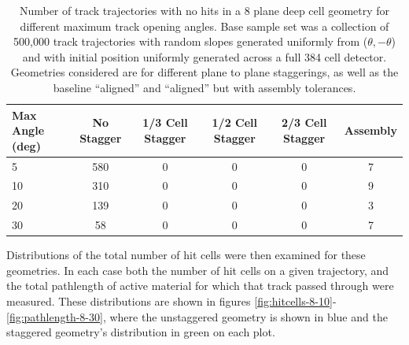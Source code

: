 \begin{table}[tb]
\begin{center}
\begin{tabular}{|l|c|c|c|c|c|}
\hline
Max Angle (deg)                 & No Stagger     & 1/3 Cell Stagger & 1/2 Cell Stagger & 2/3 Cell Stagger & Assembly\\
\hline
5                               &  580           & 0                & 0                & 0                & 7  \\
10                              &  310           & 0                & 0                & 0                & 9  \\
20                              &  139           & 0                & 0                & 0                & 3  \\
30                              &  58            & 0                & 0                & 0                & 7  \\
\hline
\end{tabular}
\caption[8 Cell Missed Hits]{Number of track trajectories with no hits in a 8 plane deep cell geometry for different maximum track opening angles.  Base sample set was a collection of 500,000 track trajectories with random slopes generated uniformly from ($\theta,-\theta$) and with initial position uniformly generated across a full 384 cell detector.  Geometries considered are for different plane to plane staggerings, as well as the baseline ``aligned'' and ``aligned'' but with assembly tolerances.}
\label{table:no-hits-8cell}
\end{center}
\end{table}

Distributions of the total number of hit cells were then examined for these geometries.  In each case both the number of hit cells on a given trajectory, and the total pathlength of active material for which that track passed through were measured.  These distributions are shown in figures \ref{fig:hitcells-8-10}-\ref{fig:pathlength-8-30}, where the unstaggered geometry is shown in blue and the staggered geometry's distribution in green on each plot.

